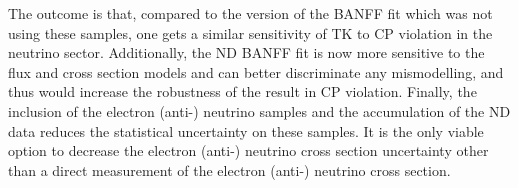 The outcome is that, compared to the version of the \Gls{BANFF} fit
which was not using these samples, one gets a similar sensitivity of
\Gls{TK} to \Gls{CP} violation in the neutrino sector. Additionally,
the \Gls{ND} \Gls{BANFF} fit is now more sensitive to the flux and
cross section models and can better discriminate any mismodelling, and
thus would increase the robustness of the result in \Gls{CP}
violation. Finally, the inclusion of the electron (anti-) neutrino
samples and the accumulation of the \Gls{ND} data reduces the
statistical uncertainty on these samples. It is the only viable option
to decrease the electron (anti-) neutrino cross section uncertainty
other than a direct measurement of the electron (anti-) neutrino cross
section.


